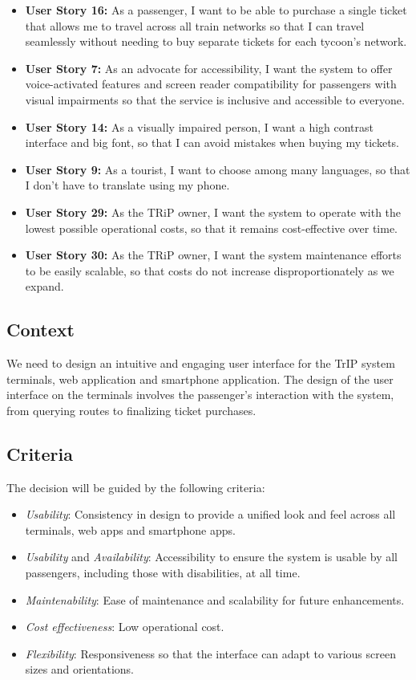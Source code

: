 \begin{itemize}
    \item \textbf{User Story 16:} As a passenger, I want to be able to purchase a single ticket that allows me to travel across all train networks so that I can travel seamlessly without needing to buy separate tickets for each tycoon's network.
    \item \textbf{User Story 7:} As an advocate for accessibility, I want the system to offer voice-activated features and screen reader compatibility for passengers with visual impairments so that the service is inclusive and accessible to everyone.
    \item \textbf{User Story 14:} As a visually impaired person, I want a high contrast interface and big font, so that I can avoid mistakes when buying my tickets.
    \item \textbf{User Story 9:} As a tourist, I want to choose among many languages, so that I don't have to translate using my phone.
    \item \textbf{User Story 29:} As the TRiP owner, I want the system to operate with the lowest possible operational costs, so that it remains cost-effective over time.
    \item \textbf{User Story 30:} As the TRiP owner, I want the system maintenance efforts to be easily scalable, so that costs do not increase disproportionately as we expand.
    
\end{itemize}

\subsection*{Context}
We need to design an intuitive and engaging user interface for the TrIP system terminals, web application and smartphone application.
The design of the user interface on the terminals involves the passenger's interaction with the system, from querying routes to finalizing ticket purchases.

\subsection*{Criteria}
The decision will be guided by the following criteria:
\begin{itemize}
    \item \textit{Usability}: Consistency in design to provide a unified look and feel across all terminals, web apps and smartphone apps.
    \item \textit{Usability} and \textit{Availability}: Accessibility to ensure the system is usable by all passengers, including those with disabilities, at all time.
    \item \textit{Maintenability}: Ease of maintenance and scalability for future enhancements.
    \item \textit{Cost effectiveness}: Low operational cost.
    \item \textit{Flexibility}: Responsiveness so that the interface can adapt to various screen sizes and orientations.
\end{itemize}

